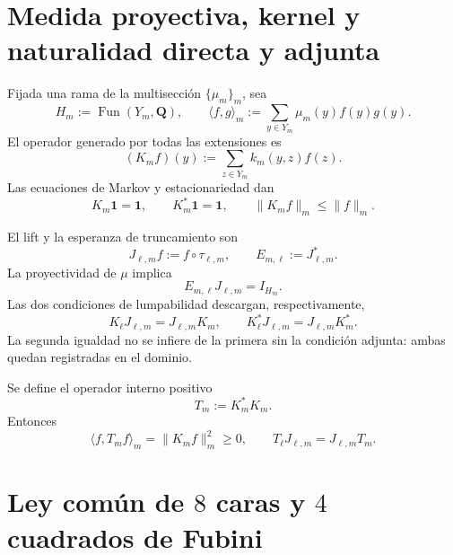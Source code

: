 \section{Medida proyectiva, kernel y naturalidad directa y adjunta}

Fijada una rama de la multisección \(\{\mu_m\}_m\), sea
\begin{equation}\label{eq:gauint-hm}
 H_m:=\operatorname{Fun}(Y_m,\mathbf Q),
 \qquad
 \langle f,g\rangle_m:=\sum_{y\in Y_m}\mu_m(y)f(y)g(y).
\end{equation}
El operador generado por todas las extensiones es
\begin{equation}\label{eq:gauint-km}
 (K_mf)(y):=\sum_{z\in Y_m}k_m(y,z)f(z).
\end{equation}
Las ecuaciones de Markov y estacionariedad dan
\begin{equation}\label{eq:gauint-markov-estacionario}
 K_m\mathbf1=\mathbf1,
 \qquad
 K_m^*\mathbf1=\mathbf1,
 \qquad
 \|K_mf\|_m\le\|f\|_m.
\end{equation}

El lift y la esperanza de truncamiento son
\begin{equation}\label{eq:gauint-lift-esperanza}
 J_{\ell,m}f:=f\circ\tau_{\ell,m},
 \qquad
 E_{m,\ell}:=J_{\ell,m}^*.
\end{equation}
La proyectividad de \(\mu\) implica
\begin{equation}\label{eq:gauint-ej-identidad}
 E_{m,\ell}J_{\ell,m}=I_{H_m}.
\end{equation}
Las dos condiciones de lumpabilidad descargan, respectivamente,
\begin{equation}\label{eq:gauint-naturalidad-directa-adjunta}
 K_\ell J_{\ell,m}=J_{\ell,m}K_m,
 \qquad
 K_\ell^*J_{\ell,m}=J_{\ell,m}K_m^*.
\end{equation}
La segunda igualdad no se infiere de la primera sin la condición adjunta:
ambas quedan registradas en el dominio.

Se define el operador interno positivo
\begin{equation}\label{eq:gauint-transferencia-t}
 T_m:=K_m^*K_m.
\end{equation}
Entonces
\begin{equation}\label{eq:gauint-t-positivo-natural}
 \langle f,T_mf\rangle_m=\|K_mf\|_m^2\ge0,
 \qquad
 T_\ell J_{\ell,m}=J_{\ell,m}T_m.
\end{equation}

\section{Ley común de \(8\) caras y \(4\) cuadrados de Fubini}

